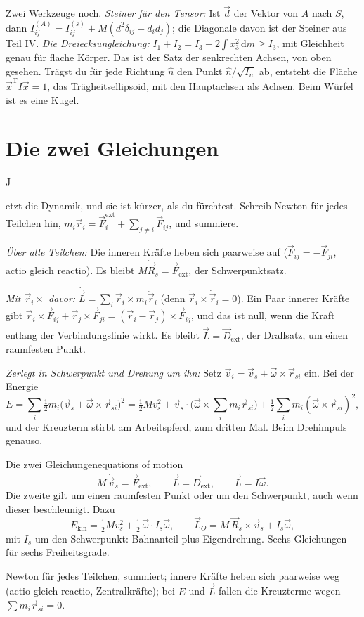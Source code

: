 \documentclass[deutsch]{kaelearn}
\newcommand\dd{\mathrm{d}}
\newcommand\ext{_{\mathrm{ext}}}
\begin{document}
Zwei Werkzeuge noch. \emph{Steiner für den Tensor:} Ist $\vec d$ der Vektor von $A$ nach $S$, dann
$I^{(A)}_{ij} = I^{(s)}_{ij} + M(d^2\delta_{ij}-d_id_j)$; die Diagonale davon ist der Steiner aus Teil IV. \emph{Die Dreiecksungleichung:}
$I_1+I_2 = I_3 + 2\int x_3^2\,\dd m\ge I_3$, mit Gleichheit genau für flache Körper. Das ist der Satz der senkrechten Achsen, von oben
gesehen. Trägst du für jede Richtung $\hat n$ den Punkt $\hat n/\sqrt{I_n}$ ab, entsteht die Fläche $\vec x^{\mathrm T}I\vec x = 1$, das
Trägheitsellipsoid, mit den Hauptachsen als Achsen. Beim Würfel ist es eine Kugel.

\section{Die zwei Gleichungen}

\opening{J}{etzt die} Dynamik, und sie ist kürzer, als du fürchtest. Schreib Newton für jedes Teilchen hin,
$m_i\ddot{\vec r}_i = \vec F_i^{\mathrm{ext}} + \sum_{j\ne i}\vec F_{ij}$, und summiere.

\emph{Über alle Teilchen:} Die inneren Kräfte heben sich paarweise auf ($\vec F_{ij} = -\vec F_{ji}$, actio gleich reactio). Es bleibt
$M\ddot{\vec R}_s = \vec F\ext$, der Schwerpunktsatz.

\emph{Mit $\vec r_i\times$ davor:} $\dot{\vec L} = \sum_i\vec r_i\times m_i\ddot{\vec r}_i$ (denn $\dot{\vec r}_i\times\dot{\vec r}_i = 0$).
Ein Paar innerer Kräfte gibt $\vec r_i\times\vec F_{ij}+\vec r_j\times\vec F_{ji} = (\vec r_i-\vec r_j)\times\vec F_{ij}$, und das ist null,
wenn die Kraft entlang der Verbindungslinie wirkt. Es bleibt $\dot{\vec L} = \vec D\ext$, der Drallsatz, um einen raumfesten Punkt.

\emph{Zerlegt in Schwerpunkt und Drehung um ihn:} Setz $\vec v_i = \vec v_s+\vec\omega\times\vec r_{si}$ ein. Bei der Energie
\[
  E = \sum_i\tfrac12m_i\big(\vec v_s+\vec\omega\times\vec r_{si}\big)^2
    = \tfrac12Mv_s^2 + \vec v_s\cdot\Big(\vec\omega\times\sum_im_i\vec r_{si}\Big) + \tfrac12\sum_im_i(\vec\omega\times\vec r_{si})^2 ,
\]
und der Kreuzterm stirbt am Arbeitspferd, zum dritten Mal. Beim Drehimpuls genauso.

\begin{keystone}{Die zwei Gleichungen}{equations of motion}
\[
  M\,\dot{\vec v}_s = \vec F\ext, \qquad \dot{\vec L} = \vec D\ext, \qquad \vec L = I\vec\omega .
\]
Die zweite gilt um einen raumfesten Punkt oder um den Schwerpunkt, auch wenn dieser beschleunigt. Dazu
\[
  E_{\mathrm{kin}} = \tfrac12Mv_s^2 + \tfrac12\,\vec\omega\cdot I_s\vec\omega, \qquad
  \vec L_O = M\,\vec R_s\times\vec v_s + I_s\vec\omega ,
\]
mit $I_s$ um den Schwerpunkt: Bahnanteil plus Eigendrehung. Sechs Gleichungen für sechs Freiheitsgrade.

\smallskip{}\quad Newton für jedes Teilchen, summiert; innere Kräfte heben sich
paarweise weg (actio gleich reactio, Zentralkräfte); bei $E$ und $\vec L$ fallen die Kreuzterme wegen $\sum m_i\vec r_{si} = 0$.
\end{keystone}
\end{document}
